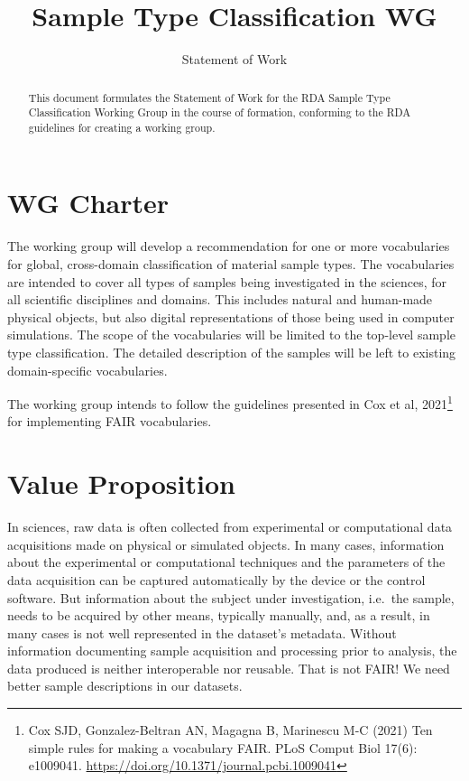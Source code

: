 \documentclass{scrartcl}
\begin{document}
\titlehead{\hfill\texttt{[image: rda-logo]}}
\title{Sample Type Classification WG}
\subtitle{Statement of Work}

\maketitle

\begin{abstract}\noindent
  This document formulates the Statement of Work for the RDA Sample
  Type Classification Working Group in the course of formation,
  conforming to the RDA guidelines for creating a working group.
\end{abstract}

\section{WG Charter}

The working group will develop a recommendation for one or more
vocabularies for global, cross-domain classification of material
sample types.  The vocabularies are intended to cover all types of
samples being investigated in the sciences, for all scientific
disciplines and domains.  This includes natural and human-made
physical objects, but also digital representations of those being used
in computer simulations.  The scope of the vocabularies will be
limited to the top-level sample type classification.  The detailed
description of the samples will be left to existing domain-specific
vocabularies.

The working group intends to follow the guidelines presented in Cox et
al, 2021\footnote{Cox SJD, Gonzalez-Beltran AN, Magagna B, Marinescu
  M-C (2021) Ten simple rules for making a vocabulary FAIR. PLoS
  Comput Biol 17(6): e1009041.
  \url{https://doi.org/10.1371/journal.pcbi.1009041}} for implementing
FAIR vocabularies.


\section{Value Proposition}

In sciences, raw data is often collected from experimental or
computational data acquisitions made on physical or simulated objects.
In many cases, information about the experimental or computational
techniques and the parameters of the data acquisition can be captured
automatically by the device or the control software.  But information
about the subject under investigation, i.e.\ the sample, needs to be
acquired by other means, typically manually, and, as a result, in many
cases is not well represented in the dataset’s metadata.  Without
information documenting sample acquisition and processing prior to
analysis, the data produced is neither interoperable nor reusable.
That is not FAIR!  We need better sample descriptions in our datasets.
\end{document}
